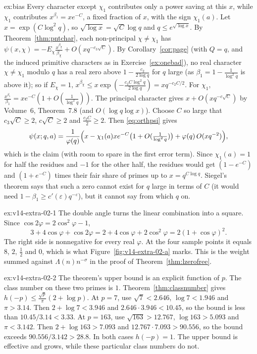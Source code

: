 \begin{solution}{ex:bias}
\idea Every character except $\chi_1$ contributes only a power saving at this $x$, while $\chi_1$ contributes $x^{\beta_1}=xe^{-C}$, a fixed fraction of $x$, with the sign $\chi_1(a)$.
\writeup Let $x=\exp(C\log^2q)$, so $\sqrt{\log x}=\sqrt C\log q$ and $q\le e^{\sqrt{\log x}}$. By Theorem~\ref{thm:pntchar}, each non-principal $\chi\ne\chi_1$ has $\psi(x,\chi)=-E_\chi\frac{x^{\beta_\chi}}{\beta_\chi}+O(xq^{-c_3\sqrt C})$. By Corollary~\ref{cor:page} (with $Q=q$, and the induced primitive characters as in Exercise~\ref{ex:onebad}), no real character $\chi\ne\chi_1$ modulo $q$ has a real zero above
$1-\frac{c_2}{2\log q}$ for $q$ large (as $\beta_1=1-\frac1{\log^2q}$ is above it); so if $E_\chi=1$, $x^{\beta_\chi}\le x\exp(-\frac{c_2C\log^2q}{2\log q})=xq^{-c_2C/2}$. For $\chi_1$, $\frac{x^{\beta_1}}{\beta_1}=x e^{-C}(1+O(\frac1{\log^2q}))$. The principal character gives $x+O(xq^{-c\sqrt C})$ by Volume~6, Theorem~7.8 (and $O(\log q\log x)$). Choose $C$ so large that
$c_3\sqrt C\ge2$, $c\sqrt C\ge2$ and $\frac{c_2C}2\ge2$. Then \eqref{eq:orthpsi} gives
\[
\psi(x;q,a)=\frac1{\varphi(q)}\Bigl(x-\chi_1(a)xe^{-C}\bigl(1+O(\tfrac1{\log^2q})\bigr)+\varphi(q)\,O(xq^{-2})\Bigr),
\]
which is the claim (with room to spare in the first error term). Since $\chi_1(a)=1$ for half the residues and $-1$ for the other half, the residues would get $(1-e^{-C})$ and $(1+e^{-C})$ times their fair share of primes up to $x=q^{C\log q}$. Siegel's theorem says that such a zero cannot exist for $q$ large in terms of $C$ (it would need $1-\beta_1\ge c'(\varepsilon)q^{-\varepsilon}$), but it cannot say from which $q$ on.
\end{solution}

\begin{solution}{ex:v14-extra-02-1}
\idea The double angle turns the linear combination into a square.
\writeup Since $\cos 2\varphi=2\cos^2\varphi-1$,
\[
3+4\cos\varphi+\cos 2\varphi=2+4\cos\varphi+2\cos^2\varphi=2(1+\cos\varphi)^2.
\]
The right side is nonnegative for every real $\varphi$. At the four sample points it equals $8$, $2$, $\frac12$ and $0$, which is what Figure~\ref{fig:v14-extra-02-a} marks. This is the weight summed against $\Lambda(n)n^{-\sigma}$ in the proof of Theorem~\ref{thm:lzerofree}.
\end{solution}

\begin{solution}{ex:v14-extra-02-2}
\idea The theorem's upper bound is an explicit function of $p$. The class number on these two primes is $1$.
\writeup Theorem~\ref{thm:classnumber} gives $h(-p)\le\frac{\sqrt p}\pi(2+\log p)$. At $p=7$, use $\sqrt7<2.646$, $\log7<1.946$ and $\pi>3.14$. Then $2+\log7<3.946$ and $2.646\cdot3.946<10.45$, so the bound is less than $10.45/3.14<3.33$. At $p=163$, use $\sqrt{163}>12.767$, $\log163>5.093$ and $\pi<3.142$. Then $2+\log163>7.093$ and $12.767\cdot7.093>90.556$, so the bound exceeds $90.556/3.142>28.8$. In both cases $h(-p)=1$. The upper bound is effective and grows, while these particular class numbers do not.
\end{solution}

